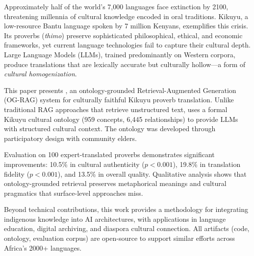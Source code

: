 
Approximately half of the world's 7,000 languages face extinction by 2100, threatening millennia of cultural knowledge encoded in oral traditions. Kikuyu, a low-resource Bantu language spoken by 7 million Kenyans, exemplifies this crisis. Its proverbs (\emph{thimo}) preserve sophisticated philosophical, ethical, and economic frameworks, yet current language technologies fail to capture their cultural depth. Large Language Models (LLMs), trained predominantly on Western corpora, produce translations that are lexically accurate but culturally hollow---a form of \emph{cultural homogenization}.

This paper presents \thillmo{}, an ontology-grounded Retrieval-Augmented Generation (OG-RAG) system for culturally faithful Kikuyu proverb translation. Unlike traditional RAG approaches that retrieve unstructured text, \thillmo{} uses a formal Kikuyu cultural ontology (959 concepts, 6,445 relationships) to provide LLMs with structured cultural context. The ontology was developed through participatory design with community elders.

Evaluation on 100 expert-translated proverbs demonstrates significant improvements: 10.5\% in cultural authenticity ($p<0.001$), 19.8\% in translation fidelity ($p<0.001$), and 13.5\% in overall quality. Qualitative analysis shows that ontology-grounded retrieval preserves metaphorical meanings and cultural pragmatics that surface-level approaches miss.

Beyond technical contributions, this work provides a methodology for integrating indigenous knowledge into AI architectures, with applications in language education, digital archiving, and diaspora cultural connection. All artifacts (code, ontology, evaluation corpus) are open-source to support similar efforts across Africa's 2000+ languages.
